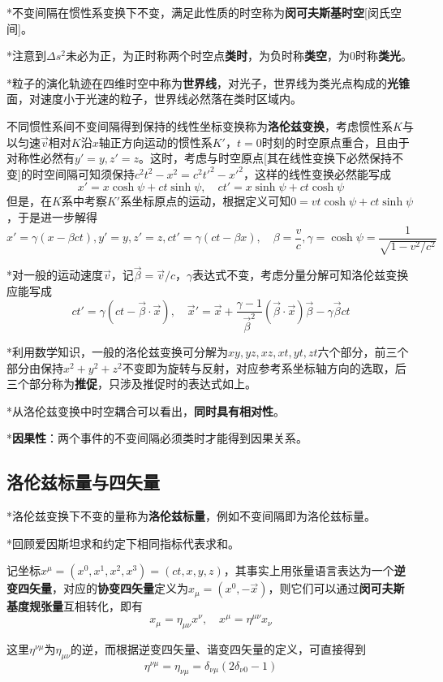 \documentclass[a4paper,UTF8,fontset=windows]{ctexart}
\newcommand*{\vvs}{\vec{v}}
\newcommand*{\vx}{\vec{x}}
\newcommand*{\vbeta}{\vec{\beta}}
\begin{document}
*不变间隔在惯性系变换下不变，满足此性质的时空称为\textbf{闵可夫斯基时空}[闵氏空间]。

*注意到$\Delta s^2$未必为正，为正时称两个时空点\textbf{类时}，为负时称\textbf{类空}，为0时称\textbf{类光}。

*粒子的演化轨迹在四维时空中称为\textbf{世界线}，对光子，世界线为类光点构成的\textbf{光锥}面，对速度小于光速的粒子，世界线必然落在类时区域内。

不同惯性系间不变间隔得到保持的线性坐标变换称为\textbf{洛伦兹变换}，考虑惯性系$K$与以匀速$\vvs$相对$K$沿$x$轴正方向运动的惯性系$K'$，$t=0$时刻的时空原点重合，且由于对称性必然有$y'=y,z'=z$。这时，考虑与时空原点[其在线性变换下必然保持不变]的时空间隔可知须保持$c^2t^2-x^2=c^2{t'}^2-{x'}^2$，这样的线性变换必然能写成
$$x'=x\cosh\psi+ct\sinh\psi,\quad ct'=x\sinh\psi+ct\cosh\psi$$
但是，在$K$系中考察$K'$系坐标原点的运动，根据定义可知$0=vt\cosh\psi+ct\sinh\psi$，于是进一步解得
$$x'=\gamma(x-\beta ct),y'=y,z'=z,ct'=\gamma(ct-\beta x),\quad \beta=\frac{v}{c},\gamma=\cosh\psi=\frac{1}{\sqrt{1-v^2/c^2}}$$

*对一般的运动速度$\vvs$，记$\vbeta=\vvs/c$，$\gamma$表达式不变，考虑分量分解可知洛伦兹变换应能写成
$$ct'=\gamma(ct-\vbeta\cdot\vx),\quad\vx'=\vx+\frac{\gamma-1}{\vbeta^2}(\vbeta\cdot\vx)\vbeta-\gamma\vbeta  ct$$

*利用数学知识，一般的洛伦兹变换可分解为$xy,yz,xz,xt,yt,zt$六个部分，前三个部分由保持$x^2+y^2+z^2$不变即为旋转与反射，对应参考系坐标轴方向的选取，后三个部分称为\textbf{推促}，只涉及推促时的表达式如上。

*从洛伦兹变换中时空耦合可以看出，\textbf{同时具有相对性}。

*\textbf{因果性}：两个事件的不变间隔必须类时才能得到因果关系。

\subsection{洛伦兹标量与四矢量}
*洛伦兹变换下不变的量称为\textbf{洛伦兹标量}，例如不变间隔即为洛伦兹标量。

*回顾爱因斯坦求和约定下相同指标代表求和。

记坐标$x^\mu=(x^0,x^1,x^2,x^3)=(ct,x,y,z)$，其事实上用张量语言表达为一个\textbf{逆变四矢量}，对应的\textbf{协变四矢量}定义为$x_\mu=(x^0,-\vx)$，则它们可以通过\textbf{闵可夫斯基度规张量}互相转化，即有
$$x_\mu=\eta_{\mu\nu}x^\nu,\quad x^\mu=\eta^{\mu\nu}x_\nu$$

这里$\eta^{\nu\mu}$为$\eta_{\mu\nu}$的逆，而根据逆变四矢量、谐变四矢量的定义，可直接得到
$$\eta^{\nu\mu}=\eta_{\nu\mu}=\delta_{\nu\mu}(2\delta_{\nu0}-1)$$
\end{document}
